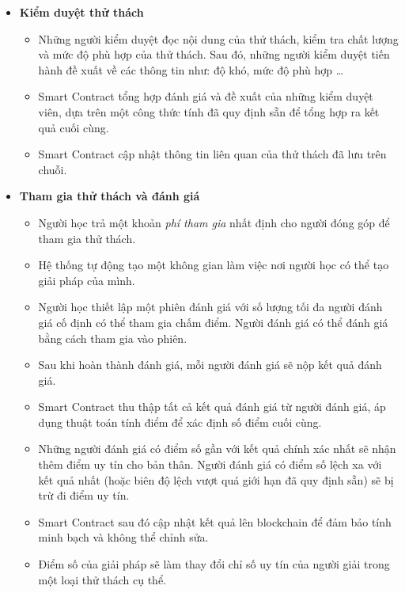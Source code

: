 \begin{enumerate}[label=\textbf{\alph*.}]
\begin{itemize}
          \item \textbf{Kiểm duyệt thử thách}
                \begin{itemize}
                  \item Những người kiểm duyệt đọc nội dung của thử thách, kiểm tra chất lượng và mức độ phù hợp của thử thách. Sau đó, những người kiểm duyệt tiến hành đề xuất về các thông tin như: độ khó, mức độ phù hợp \dots
                  \item Smart Contract tổng hợp đánh giá và đề xuất của những kiểm duyệt viên, dựa trên một công thức tính đã quy định sẵn để tổng hợp ra kết quả cuối cùng.
                  \item Smart Contract cập nhật thông tin liên quan của thử thách đã lưu trên chuỗi.
                \end{itemize}

          \item \textbf{Tham gia thử thách và đánh giá}
                \begin{itemize}
                  \item Người học trả một khoản \textit{phí tham gia} nhất định cho người đóng góp để tham gia thử thách.
                  \item Hệ thống tự động tạo một không gian làm việc nơi người học có thể tạo giải pháp của mình.
                  \item Người học thiết lập một phiên đánh giá với số lượng tối đa người đánh giá cố định có thể tham gia chấm điểm. Người đánh giá có thể đánh giá bằng cách tham gia vào phiên.
                  \item Sau khi hoàn thành đánh giá, mỗi người đánh giá sẽ nộp kết quả đánh giá.
                  \item Smart Contract thu thập tất cả kết quả đánh giá từ người đánh giá, áp dụng thuật toán tính điểm để xác định số điểm cuối cùng.
                  \item Những người đánh giá có điểm số gần với kết quả chính xác nhất sẽ nhận thêm điểm uy tín cho bản thân. Người đánh giá có điểm số lệch xa với kết quả nhất (hoặc biên độ lệch vượt quá giới hạn đã quy định sẵn) sẽ bị trừ đi điểm uy tín.
                  \item Smart Contract sau đó cập nhật kết quả lên blockchain để đảm bảo tính minh bạch và không thể chỉnh sửa.
                  \item Điểm số của giải pháp sẽ làm thay đổi chỉ số uy tín của người giải trong một loại thử thách cụ thể.
                \end{itemize}


\end{itemize}
\end{enumerate}
